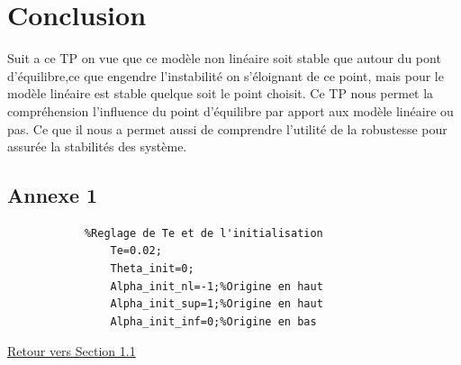 \documentclass[12pt, a4paper, openany]{report}
\begin{document}
      
\chapter*{Conclusion}
      Suit a ce TP on vue que ce modèle non linéaire soit stable que autour du pont d'équilibre,ce que engendre l'instabilité on s’éloignant de ce point, mais pour le modèle linéaire est stable quelque soit le point choisit.
      Ce TP nous permet la compréhension l’influence du point d’équilibre par apport aux modèle linéaire ou pas.
      Ce que il nous a permet aussi de comprendre l'utilité de la robustesse pour assurée la stabilités des système.   








\begin{appendices}
\chapter*{Annexe 1}
		\begin{lstlisting}
			%Reglage de Te et de l'initialisation
    			Te=0.02;
    			Theta_init=0;
    			Alpha_init_nl=-1;%Origine en haut
    			Alpha_init_sup=1;%Origine en haut
    			Alpha_init_inf=0;%Origine en bas
		\end{lstlisting}
		\hyperref[annexe1]{Retour vers Section 1.1}\label{section1.1}
\end{appendices}





%
%
\end{document}
